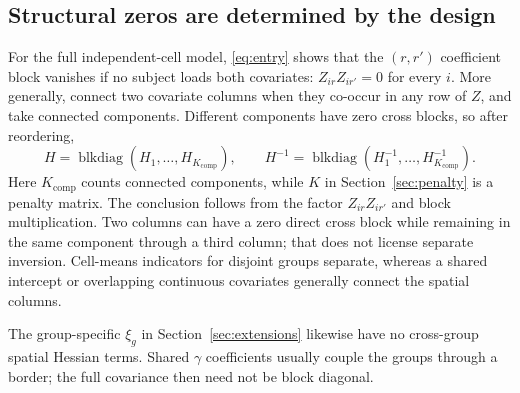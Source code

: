 \documentclass[11pt,a4paper]{article}
\newcommand{\blkdiag}{\operatorname{blkdiag}}
\numberwithin{equation}{section}
\begin{document}
\subsection{Structural zeros are determined by the design}
For the full independent-cell model, \eqref{eq:entry} shows that the
$(r,r')$ coefficient block vanishes if no subject loads both covariates:
$Z_{ir}Z_{ir'}=0$ for every $i$. More generally, connect two covariate
columns when they co-occur in any row of $Z$, and take connected components.
Different components have zero cross blocks, so after reordering,
\begin{equation}
 H=\blkdiag(H_1,\ldots,H_{K_{\mathrm{comp}}}),\qquad
 H^{-1}=\blkdiag(H_1^{-1},\ldots,H_{K_{\mathrm{comp}}}^{-1}).
 \label{eq:block}
\end{equation}
Here $K_{\mathrm{comp}}$ counts connected components, while $K$ in
Section~\ref{sec:penalty} is a penalty matrix. The conclusion follows
from the factor $Z_{ir}Z_{ir'}$ and block multiplication.
Two columns can have a zero direct cross block while remaining in the same
component through a third column; that does not license separate inversion.
Cell-means indicators for disjoint groups separate, whereas a shared intercept
or overlapping continuous covariates generally connect the spatial columns.

The group-specific $\xi_g$ in Section~\ref{sec:extensions} likewise have no
cross-group spatial Hessian terms. Shared $\gamma$ coefficients usually
couple the groups through a border; the full covariance then need not be
block diagonal.
\end{document}
